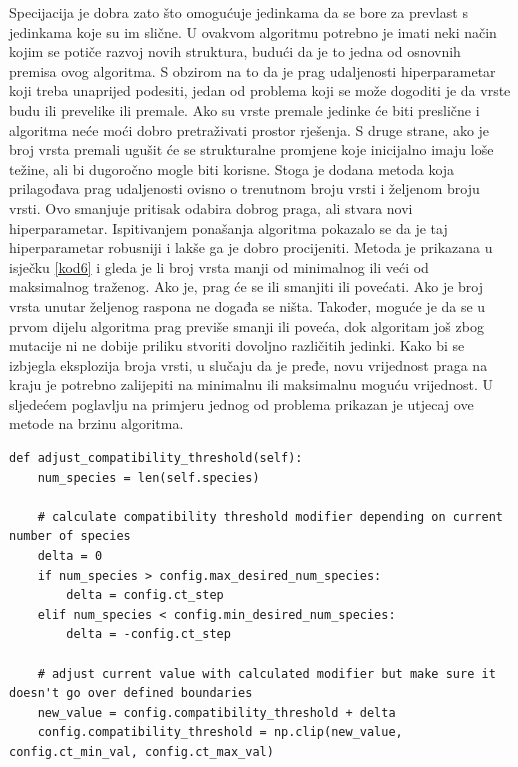 \documentclass[times, utf8, diplomski, numeric]{fer}
\begin{document}
Specijacija je dobra zato što omogućuje jedinkama da se bore za prevlast s jedinkama koje su im slične. U ovakvom algoritmu potrebno je imati neki način kojim se potiče razvoj novih struktura, budući da je to jedna od osnovnih premisa ovog algoritma. S obzirom na to da je prag udaljenosti hiperparametar koji treba unaprijed podesiti, jedan od problema koji se može dogoditi je da vrste budu ili prevelike ili premale. Ako su vrste premale jedinke će biti preslične i algoritma neće moći dobro pretraživati prostor rješenja. S druge strane, ako je broj vrsta premali ugušit će se strukturalne promjene koje inicijalno imaju loše težine, ali bi dugoročno mogle biti korisne. Stoga je dodana metoda koja prilagođava prag udaljenosti ovisno o trenutnom broju vrsti i željenom broju vrsti. Ovo smanjuje pritisak odabira dobrog praga, ali stvara novi hiperparametar. Ispitivanjem ponašanja algoritma pokazalo se da je taj hiperparametar robusniji i lakše ga je dobro procijeniti. Metoda je prikazana u isječku \ref{kod6} i gleda je li broj vrsta manji od minimalnog ili veći od maksimalnog traženog. Ako je, prag će se ili smanjiti ili povećati. Ako je broj vrsta unutar željenog raspona ne događa se ništa. Također, moguće je da se u prvom dijelu algoritma prag previše smanji ili poveća, dok algoritam još zbog mutacije ni ne dobije priliku stvoriti dovoljno različitih jedinki. Kako bi se izbjegla eksplozija broja vrsti, u slučaju da je pređe, novu vrijednost praga na kraju je potrebno zalijepiti na minimalnu ili maksimalnu moguću vrijednost. U sljedećem poglavlju na primjeru jednog od problema prikazan je utjecaj ove metode na brzinu algoritma.

\begin{lstlisting}[frame=single, label=kod6, caption=Izvorni tekst metode \textit{adjust\_compatibility\_threshold} u klasi \textit{Population}]
def adjust_compatibility_threshold(self):
	num_species = len(self.species)

	# calculate compatibility threshold modifier depending on current number of species
	delta = 0
	if num_species > config.max_desired_num_species:
		delta = config.ct_step
	elif num_species < config.min_desired_num_species:
		delta = -config.ct_step

	# adjust current value with calculated modifier but make sure it doesn't go over defined boundaries
	new_value = config.compatibility_threshold + delta
	config.compatibility_threshold = np.clip(new_value, config.ct_min_val, config.ct_max_val)
\end{lstlisting}
\end{document}
